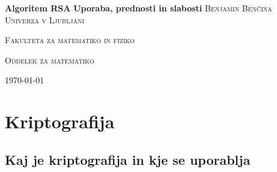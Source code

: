 \documentclass[a4paper, 12pt]{article} %
\begin{document}
\begin{titlepage}
\centering
\textbf{\Huge{Algoritem RSA}}
\vfill
\textbf{\LARGE{Uporaba, prednosti in slabosti}}
\vfill\vfill
\textsc{\Large{Benjamin Benčina}}
\vfill\vfill
\textsc{\large{Univerza v Ljubljani}}

\textsc{\large{Fakulteta za matematiko in fiziko}}

\textsc{\large{Oddelek za matematiko}}
\vfill\vfill\vfill
	
{\large\today}

\end{titlepage}

\tableofcontents
\newpage

\section{Kriptografija}
\subsection{Kaj je kriptografija in kje se uporablja}
\end{document}

